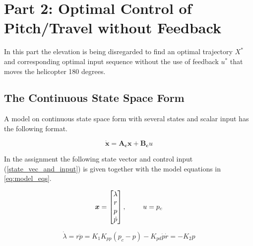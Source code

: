 \documentclass[a4paper, 12pt]{article}\usepackage[utf8]{inputenc}
\begin{document}
\clearpage

\section{Part 2: Optimal Control of Pitch/Travel without Feedback}

In this part the elevation is being disregarded to find an optimal trajectory $X^*$ and corresponding optimal input sequence without the use of feedback $u^*$ that moves the helicopter 180 degrees.

\subsection{The Continuous State Space Form}
A model on continuous state space form with several states and scalar input has the following format. 

\begin{equation}
    \boldsymbol{\dot{x}} = \boldsymbol{A_c}\boldsymbol{x} + \boldsymbol{B_c} u
\end{equation}

In the assignment the following state vector and control input (\ref{state_vec_and_input}) is given together with the model equations in \ref{eq:model_eqs}.

\begin{equation} \label{state_vec_and_input}
    \boldsymbol{x} = 
    \begin{bmatrix}
        \lambda\\
        r\\
        p\\
        \dot{p}\\
    \end{bmatrix},
    \begin{tabular}{cc}
         &  \\
         & 
    \end{tabular}
    u=p_c
\end{equation} 

\begin{subequations}\label{eq:model_eqs}
    \begin{equation}
        \dot{\lambda}=r
    \end{equation}
    \begin{equation}
        \ddot{p}=K_1K_{pp}(p_c-p)-K_{pd}\dot{p}
    \end{equation}
    \begin{equation}
        \dot{r}=-K_2p
    \end{equation}
\end{subequations}
\end{document}
